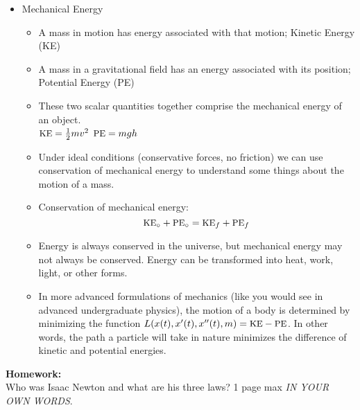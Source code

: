 \documentclass[12pt]{report}
\newcommand{\ke}{\mbox{\small KE}}
\newcommand{\pe}{\mbox{\small PE}}
\begin{document}
\begin{itemize}
\item Mechanical Energy
\begin{itemize}
\item A mass in motion has energy associated with that motion; Kinetic Energy (\ke)
\item A mass in a gravitational field has an energy associated with its position; \\ Potential Energy (\pe)
\item These two scalar quantities together comprise the mechanical energy of an object. \\
\mbox{} \hfill $\ke=\frac{1}{2}mv^2$ \hspace{2cm} $\pe=mgh$ \hfill \mbox{}
\item Under ideal conditions (conservative forces, no friction) we can use conservation of mechanical energy to understand some things about the motion of a mass.
\item Conservation of mechanical energy:
$$\ke_\circ + \pe_\circ = \ke_f + \pe_f$$
\item Energy is always conserved in the universe, but mechanical energy may not always be conserved.  Energy can be transformed into heat, work, light, or other forms.
\item In more advanced formulations of mechanics (like you would see in advanced undergraduate physics), the motion of a body is determined by minimizing the function $L(x(t), x'(t), x''(t), m) = \ke - \pe$.  In other words, the path a particle will take in nature minimizes the difference of kinetic and potential energies.
\end{itemize}

\end{itemize}


{\bf Homework:} \\ Who was Isaac Newton and what are his three laws?  1 page max \emph{IN YOUR OWN WORDS}.
\end{document}
